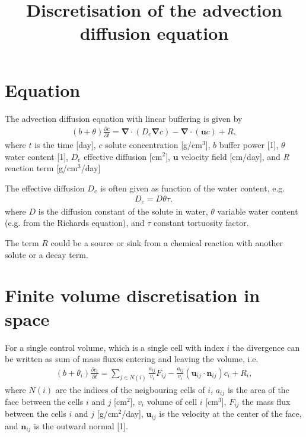 \documentclass[a4paper,10pt]{article}
\title{Discretisation of the advection diffusion equation}
\author{}
\begin{document}
\maketitle

\section{Equation}

The advection diffusion equation with linear buffering is given by
\begin{eqnarray}
 (b+\theta) \frac{\partial c}{\partial t}  = \mathbf{\nabla} \cdot (D_e \mathbf{\nabla} c) - \mathbf{\nabla} \cdot (\mathbf{u} c) + R,  
\end{eqnarray}
where $t$ is the time [day], $c$  solute concentration [g/cm$^3$], $b$ buffer power [1], $\theta$ water content [1], $D_e$ effective diffusion [cm$^2$], $\mathbf{u}$ velocity field [cm/day], and $R$ reaction term [g/cm$^3$/day]    

The effective diffusion $D_e$ is often given as function of the water content, e.g.
\begin{eqnarray}
 D_e = D \theta  \tau,  
\end{eqnarray}
where $D$ is the diffusion constant of the solute in water, $\theta$ variable water content (e.g. from the Richards equation), and $\tau$ constant tortuosity factor.

The term $R$ could be a source or sink from a chemical reaction with another solute or a decay term.

\section{Finite volume discretisation in space}

For a single control volume, which is a single cell with index $i$ the divergence can be written as sum of mass fluxes entering and leaving the volume, i.e.
\begin{eqnarray}
 (b+\theta_i) \frac{\partial c_i}{\partial t}  = \sum_{j \in N(i)} \frac{a_{ij}}{v_i}  F_{ij} - \frac{a_{ij}}{v_i}(\mathbf{u}_{ij} \cdot \mathbf{n}_{ij}) c_i + R_i,  \label{eqn:fv}
\end{eqnarray}
where $N(i)$ are the indices of the neigbouring cells of $i$, $a_{ij}$ is the area of the face between the cells $i$ and $j$ [cm$^2$], $v_i$ volume of cell $i$ [cm$^3$], $F_{ij}$ the mass flux between the cells $i$ and $j$ [g/cm$^2$/day], $\mathbf{u}_{ij}$ is the velocity at the center of the face, and $\mathbf{n}_{ij}$ is the outward normal [1].
\end{document}
